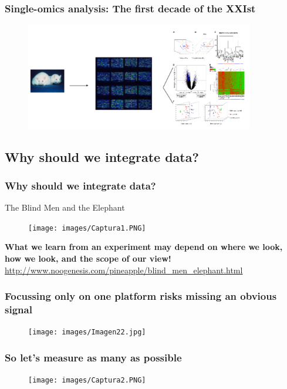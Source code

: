 \documentclass{beamer}
\begin{document}
\begin{frame}
	\frametitle{Single-omics analysis: The first decade of the XXIst}
	\begin{figure}[ht]
		\centering
		\includegraphics[width=100mm]{images/diseaseStudySingleOmics.png}
	\end{figure} 
\end{frame}



 
\subsection{Why should we integrate data?}
  
  
  \begin{frame}
  	\frametitle{Why should we integrate data?}
  	The Blind Men and the Elephant
  	\begin{figure}[ht]
  		\centering
  		\texttt{[image: images/Captura1.PNG]}
  	\end{figure} 
  \textbf{	What we learn from an experiment may depend on where we look, how we look, and the scope of our view!}
  {\tiny 	\url{http://www.noogenesis.com/pineapple/blind_men_elephant.html }}
  \end{frame}
  
  
  \begin{frame}
  	\frametitle{Focussing only on one platform risks missing an obvious signal}
  		\begin{figure}[ht]
  			\centering
  			\texttt{[image: images/Imagen22.jpg]}
  		\end{figure} 
  \end{frame}
  
  
  \begin{frame}
  	\frametitle{So let's measure as many as possible}
  		\begin{figure}[ht]
  			\centering
  			\texttt{[image: images/Captura2.PNG]}
  		\end{figure} 
  \end{frame}
  
\end{document}
